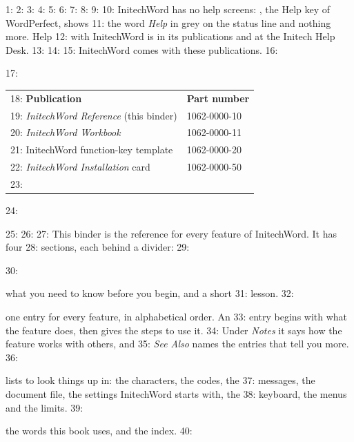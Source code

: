 1: %
2: %
3: %
4: %
5: %
6: %
7: %
8: 
9: 
10: InitechWord has no help screens: , the Help key of WordPerfect, shows
11: the word \textit{Help} in grey on the status line and nothing more.  Help
12: with InitechWord is in its publications and at the Initech Help Desk.
13: 
14: 
15: InitechWord comes with these publications.
16: \par\addvspace{4pt}
17: \noindent\begin{tabular}{@{}ll@{}}
18: \textbf{Publication} & \textbf{Part number}\\
19: \textit{InitechWord Reference} (this binder) & 1062-0000-10\\
20: \textit{InitechWord Workbook} & 1062-0000-11\\
21: InitechWord function-key template & 1062-0000-20\\
22: \textit{InitechWord Installation} card & 1062-0000-50\\
23: \end{tabular}
24: \par\addvspace{4pt}
25: 
26: 
27: This binder is the reference for every feature of InitechWord.  It has four
28: sections, each behind a divider:
29: \begin{description}
30: \item[Getting Started] what you need to know before you begin, and a short
31: lesson.
32: \item[Reference] one entry for every feature, in alphabetical order.  An
33: entry begins with what the feature does, then gives the steps to use it.
34: Under \textit{Notes} it says how the feature works with others, and
35: \textit{See Also} names the entries that tell you more.
36: \item[Appendix] lists to look things up in: the characters, the codes, the
37: messages, the document file, the settings InitechWord starts with, the
38: keyboard, the menus and the limits.
39: \item[Glossary/Index] the words this book uses, and the index.
40: \end{description}
